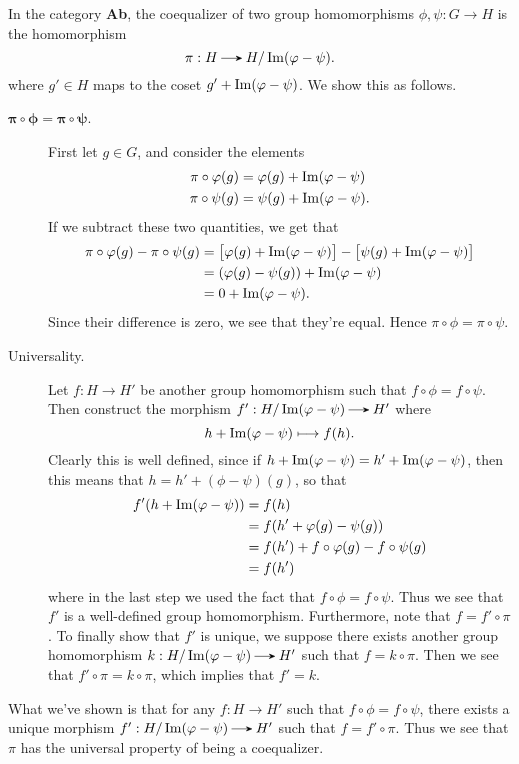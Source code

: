     \begin{example}
        In the category \textbf{Ab}, the coequalizer of two group
    homomorphisms $\phi, \psi: G \to H$ is the homomorphism 
    \[
        \pi: H \to H/\im(\phi - \psi).
    \]
    where $g' \in H$ maps to the coset $g' + \operatorname{\rm{Im}}(\varphi - \psi)$. We
    show this as follows.
    \begin{description}
        \item[$\bm{\pi \circ \phi = \pi \circ \psi}$.] First let $g \in
        G$, and consider the elements 
        \begin{align*}
            \pi\circ \varphi(g) &= \varphi(g) + \operatorname{\rm{Im}}(\varphi - \psi)\\
            \pi\circ \psi(g) &= \psi(g) + \operatorname{\rm{Im}}(\varphi - \psi).
        \end{align*}
        If we subtract these two quantities, we get that 
        \begin{align*}
            \pi \circ \varphi(g) - \pi \circ \psi(g) 
            &= 
            \big[\varphi(g) + \operatorname{\rm{Im}}(\varphi- \psi)\big]
            - 
            \big[\psi(g) + \operatorname{\rm{Im}}(\varphi- \psi)\big]\\
            &=  (\varphi(g) - \psi(g)) + \operatorname{\rm{Im}}(\varphi- \psi)\\
            &= 0 + \operatorname{\rm{Im}}(\varphi - \psi).
        \end{align*}
        Since their difference is zero, we see that they're equal.
        Hence $\pi \circ \phi = \pi \circ \psi$. 
        
        \item[Universality.] Let $f: H \to H'$ be another group
        homomorphism such that $f \circ \phi = f \circ \psi$. Then
        construct the morphism $f': H/\im(\phi - \psi) \to H'$
        where 
        \[
            h + \operatorname{\rm{Im}}(\varphi - \psi) \longmapsto f(h).
        \]
        Clearly this is well defined, since  if  $h + \operatorname{\rm{Im}}(\varphi -
        \psi) = h' + \operatorname{\rm{Im}}(\varphi - \psi)$, then this means that $h =
        h' + (\phi - \psi)(g)$, so that  
        \begin{align*}
            f'(h + \operatorname{\rm{Im}}(\varphi-  \psi)) &= f(h)\\
            &= f(h' + \varphi(g) - \psi(g))\\
            &= f(h') + f\circ\varphi(g) - f\circ\psi(g)\\
            &= f(h')
        \end{align*}
        where in the last step we used the fact  that $f \circ
        \phi = f \circ \psi$. Thus we see that $f'$ is a
        well-defined group homomorphism. Furthermore, note that
        $f = f' \circ \pi$. To finally show that $f'$ is unique,
        we suppose there exists another group homomorphism
        $k:H/\im(\phi-\psi) \to H'$ such that $f = k\circ \pi$.
        Then we see that $f' \circ \pi = k \circ \pi$, which
        implies that $f' = k$. 
    \end{description}
    What we've shown is that for any $f: H \to H'$ such that
    $f \circ \phi = f \circ \psi$, there exists a unique
    morphism $f' : H/\im(\phi - \psi) \to H'$ such that $f = f' \circ
    \pi$. Thus we see that $\pi$ has the universal property of
    being a coequalizer. 
    \end{example}

